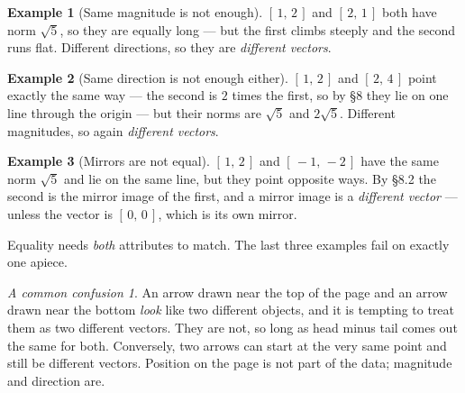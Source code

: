 \documentclass[11pt]{article}
\theoremstyle{definition}
\newtheorem{ex}{Example}
\theoremstyle{remark}
\newtheorem*{warn}{A common confusion}
\newcommand{\lattice}[4]{%
  \draw[step=1cm,gray!25,very thin] (#1,#3) grid (#2,#4);
  \draw[axisline] (#1,0) -- (#2+0.45,0) node[right,font=\scriptsize,black]{$x$};
  \draw[axisline] (0,#3) -- (0,#4+0.45) node[above,font=\scriptsize,black]{$y$};
}
\begin{document}
\begin{ex}[Same magnitude is not enough]
$[\,1,\,2\,]$ and $[\,2,\,1\,]$ both have norm $\sqrt5$, so they are equally
long --- but the first climbs steeply and the second runs flat. Different
directions, so they are \emph{different vectors}.
\end{ex}

\begin{ex}[Same direction is not enough either]
$[\,1,\,2\,]$ and $[\,2,\,4\,]$ point exactly the same way --- the second is
$2$ times the first, so by \S8 they lie on one line through the origin --- but
their norms are $\sqrt5$ and $2\sqrt5$. Different magnitudes, so again
\emph{different vectors}.
\end{ex}

\begin{ex}[Mirrors are not equal]
$[\,1,\,2\,]$ and $[\,-1,\,-2\,]$ have the same norm $\sqrt5$ and lie on the
same line, but they point opposite ways. By \S8.2 the second is the mirror image
of the first, and a mirror image is a \emph{different vector} --- unless the
vector is $[\,0,\,0\,]$, which is its own mirror.
\end{ex}

\noindent Equality needs \emph{both} attributes to match. The last three
examples fail on exactly one apiece.

\begin{warn}
An arrow drawn near the top of the page and an arrow drawn near the bottom
\emph{look} like two different objects, and it is tempting to treat them as two
different vectors. They are not, so long as head minus tail comes out the same
for both. Conversely, two arrows can start at the very same point and still be
different vectors. Position on the page is not part of the data; magnitude and
direction are.
\end{warn}

\begin{center}
\end{center}
\end{document}
